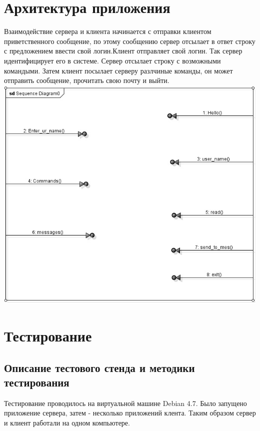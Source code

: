 \documentclass[12pt,a4paper]{report}
\begin{document}
\section{Архитектура приложения}
Взаимодействие сервера и клиента начинается с отправки клиентом приветственного сообщение, по этому сообщению сервер отсылает в ответ строку с предложением ввести свой логин.Клиент отправляет свой логин. Так сервер идентифицирует его в системе. Сервер отсылает строку с возможными командыми. Затем клиент посылает серверу разлчиные команды, он может отправить сообщение, прочитать свою почту и выйти.
\linebreak
\center \includegraphics[scale=0.8]{UDP_comm.jpg}
\flushleft

\section{Тестирование}
\subsection{Описание тестового стенда и методики тестирования}
Тестирование проводилось на виртуальной машине Debian 4.7. Было запущено приложение сервера, затем - несколько приложений клента. Таким образом сервер и клиент работали на одном компьютере.
\end{document}
